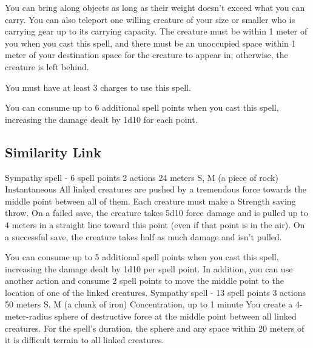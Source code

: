         You can bring along objects as long as their weight doesn't exceed what you can carry.
        You can also teleport one willing creature of your size or smaller who is carrying gear up to its carrying capacity.
        The creature must be within 1 meter of you when you cast this spell, and there must be an unoccupied space within 1 meter of your destination space for the creature to appear in; otherwise, the creature is left behind.

        You must have at least 3 charges to use this spell.

        You can consume up to 6 additional spell points when you cast this spell, increasing the damage dealt by 1d10 for each point.
\subsection*{Similarity Link}
        {Sympathy spell - 6 spell points}
        {2 actions}
        {24 meters}
        {S, M (a piece of rock)}
        {Instantaneous}
        All linked creatures are pushed by a tremendous force towards the middle point between all of them.
        Each creature must make a Strength saving throw.
        On a failed save, the creature takes 5d10 force damage and is pulled up to 4 meters in a straight line toward this point (even if that point is in the air).
        On a successful save, the creature takes half as much damage and isn't pulled.

        You can consume up to 5 additional spell points when you cast this spell, increasing the damage dealt by 1d10 per spell point.
        In addition, you can use another action and consume 2 spell points to move the middle point to the location of one of the linked creatures.
        {Sympathy spell - 13 spell points}
        {3 actions}
        {50 meters}
        {S, M (a chunk of iron)}
        {Concentration, up to 1 minute}
        You create a 4-meter-radius sphere of destructive force at the middle point between all linked creatures.
        For the spell's duration, the sphere and any space within 20 meters of it is difficult terrain to all linked creatures.

